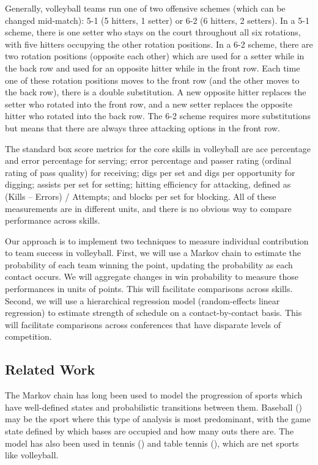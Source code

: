 \documentclass[USenglish]{article}
\theoremstyle{dgthm}
\theoremstyle{dgdef}
\begin{document}
Generally, volleyball teams run one of two offensive schemes (which can be changed mid-match): 5-1 (5 hitters, 1 setter) or 6-2 (6 hitters, 2 setters). In a 5-1 scheme, there is one setter who stays on the court throughout all six rotations, with five hitters occupying the other rotation positions. In a 6-2 scheme, there are two rotation positions (opposite each other) which are used for a setter while in the back row and used for an opposite hitter while in the front row. Each time one of these rotation positions moves to the front row (and the other moves to the back row), there is a double substitution. A new opposite hitter replaces the setter who rotated into the front row, and a new setter replaces the opposite hitter who rotated into the back row. The 6-2 scheme requires more substitutions but means that there are always three attacking options in the front row.

The standard box score metrics for the core skills in volleyball are ace percentage and error percentage for serving; error percentage and passer rating (ordinal rating of pass quality) for receiving; digs per set and digs per opportunity for digging; assists per set for setting; hitting efficiency for attacking, defined as (Kills -- Errors) / Attempts; and blocks per set for blocking. All of these measurements are in different units, and there is no obvious way to compare performance across skills.

Our approach is to implement two techniques to measure individual contribution to team success in volleyball. First, we will use a Markov chain to estimate the probability of each team winning the point, updating the probability as each contact occurs. We will aggregate changes in win probability to measure those performances in units of points. This will facilitate comparisons across skills. Second, we will use a hierarchical regression model (random-effects linear regression) to estimate strength of schedule on a contact-by-contact basis. This will facilitate comparisons across conferences that have disparate levels of competition.


\subsection{Related Work}
\label{sec:related-work}

The Markov chain has long been used to model the progression of sports which have well-defined states and probabilistic transitions between them. Baseball (\cite{bukiet_etal_1997}) may be the sport where this type of analysis is most predominant, with the game state defined by which bases are occupied and how many outs there are. The model has also been used in tennis (\cite{newton_etal_2009}) and table tennis (\cite{pfeiffer_etal_2010}), which are net sports like volleyball.
\end{document}
